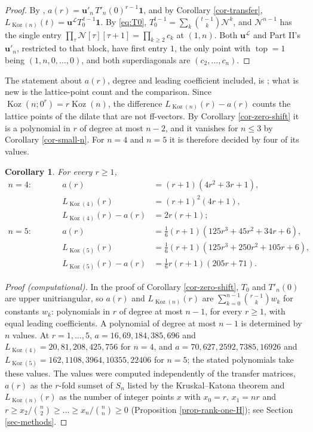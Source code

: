 \documentclass[11pt, a4paper, abstract=yes]{scrartcl}
\theoremstyle{definition}
\theoremstyle{remark}
\theoremstyle{plain}
\newtheorem{corollary}[definition]{Corollary}
\newcommand{\vek}[1]{\boldsymbol{#1}}
\theoremstyle{remark}
\theoremstyle{plain}
\newcommand{\Koz}{\operatorname{Koz}}
\newcommand{\tp}{\operatorname{top}}
\newcommand{\leannone}{\tikz[baseline=-0.6ex]\draw[leannone,line width=0.6pt] (0,0) circle (0.55ex);}
\newcommand{\leanmark}[1]{\leavevmode{\reversemarginpar\marginnote{\raggedleft#1}}}
\let\autocite\cite
\begin{document}
\begin{proof}
By \autocite[Theorem 41]{SnellmanArticle2}, \(a(r)=\vek u'_n\,T'_n(0)^{r-1}\vek 1\), and by
Corollary \ref{cor-transfer}, \(L_{\Koz(n)}(t)=\vek u^{\mathcal L}T_0^{\,t-1}\vek 1\).
By \eqref{eq:T0}, \(T_0^{t-1}=\sum_k\binom{t-1}k\mathcal N^k\), and \(\mathcal N^{n-1}\) has the single entry
\(\prod_\tau\mathcal N[\tau][\tau+1]=\prod_{k\ge2}c_k\) at \((1,n)\). Both \(\vek u^{\mathcal L}\) and
Part II's \(\vek u'_n\), restricted to that block, have first entry \(1\), the only point with \(\tp=1\) being \((1,n,0,\dots,0)\),
and both superdiagonals are \((c_2,\dots,c_n)\).
\end{proof}

The statement about \(a(r)\), degree and leading coefficient included, is
\autocite[Theorem 36]{SnellmanArticle2}; what is new is the lattice-point count and the comparison.
Since \(\Koz(n;0^r)=r\Koz(n)\), the difference \(L_{\Koz(n)}(r)-a(r)\) counts the lattice points of
the dilate that are not ff-vectors. By Corollary \ref{cor-zero-shift} it is a polynomial in \(r\) of degree at most
\(n-2\), and it vanishes for \(n\le3\) by Corollary \ref{cor-small-n}. For \(n=4\) and \(n=5\) it
is therefore decided by four of its values.

\begin{corollary}
\leanmark{\leannone}For every \(r\ge1\),
\[
  \begin{alignedat}{2}
  n=4:&\qquad& a(r)&=(r+1)(4r^2+3r+1),\\
      &&       L_{\Koz(4)}(r)&=(r+1)^2(4r+1),\\
      &&       L_{\Koz(4)}(r)-a(r)&=2r(r+1);\\[4pt]
  n=5:&&       a(r)&=\tfrac16(r+1)(125r^3+45r^2+34r+6),\\
      &&       L_{\Koz(5)}(r)&=\tfrac16(r+1)(125r^3+250r^2+105r+6),\\
      &&       L_{\Koz(5)}(r)-a(r)&=\tfrac16r(r+1)(205r+71).
  \end{alignedat}
\]
\label{cor-deficiency}
\end{corollary}

\begin{proof}[Proof (computational)]
In the proof of Corollary \ref{cor-zero-shift}, \(T_0\) and \(T'_n(0)\) are upper unitriangular, so
\(a(r)\) and \(L_{\Koz(n)}(r)\) are \(\sum_{k=0}^{n-1}\binom{r-1}k w_k\) for constants \(w_k\): polynomials
in \(r\) of degree at most \(n-1\), for every \(r\ge1\), with equal leading coefficients. A polynomial
of degree at most \(n-1\) is determined by \(n\) values. At \(r=1,\dots,5\),
\(a=16,69,184,385,696\) and \(L_{\Koz(4)}=20,81,208,425,756\) for \(n=4\), and
\(a=70,627,2592,7385,16926\) and \(L_{\Koz(5)}=162,1108,3964,10355,22406\) for \(n=5\); the stated
polynomials take these values. The values were computed independently of the transfer matrices,
\(a(r)\) as the \(r\)-fold sumset of \(S_n\) listed by the Kruskal--Katona theorem and
\(L_{\Koz(n)}(r)\) as the number of integer points \(x\) with \(x_0=r\), \(x_1=nr\) and
\(r\ge x_2/\binom n2\ge\dots\ge x_n/\binom nn\ge0\) (Proposition \ref{prop-rank-one-H}); see
Section \ref{sec-methods}.
\end{proof}
\end{document}

